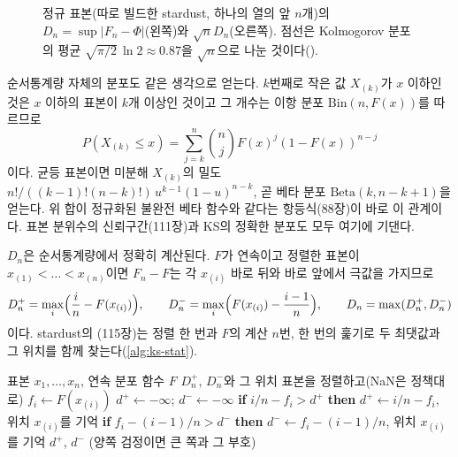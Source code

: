 \begin{figure}[htbp]
\centering
{}\hfill
{}
\caption{정규 표본(따로 빌드한 stardust, 하나의 열의 앞 $n$개)의 $D_n=\sup|F_n-\Phi|$(왼쪽)와 $\sqrt nD_n$(오른쪽). 점선은 Kolmogorov 분포의 평균 $\sqrt{\pi/2}\,\ln2\approx0.87$을 $\sqrt n$으로 나눈 것이다().}
\label{fig:gc}
\end{figure}

순서통계량 자체의 분포도 같은 생각으로 얻는다. $k$번째로 작은 값 $X_{(k)}$가 $x$ 이하인 것은 $x$ 이하의 표본이 $k$개 이상인 것이고 그 개수는 이항 분포 $\mathrm{Bin}(n,F(x))$를 따르므로
\[
P(X_{(k)}\le x)=\sum_{j=k}^n\binom njF(x)^j(1-F(x))^{n-j}
\]
이다. 균등 표본이면 미분해 $X_{(k)}$의 밀도 $n!/((k-1)!(n-k)!)\,u^{k-1}(1-u)^{n-k}$, 곧 베타 분포 $\mathrm{Beta}(k,n-k+1)$을 얻는다. 위 합이 정규화된 불완전 베타 함수와 같다는 항등식(88장)이 바로 이 관계이다. 표본 분위수의 신뢰구간(111장)과 KS의 정확한 분포도 모두 여기에 기댄다.

$D_n$은 순서통계량에서 정확히 계산된다. $F$가 연속이고 정렬한 표본이 $x_{(1)}<\dots<x_{(n)}$이면 $F_n-F$는 각 $x_{(i)}$ 바로 뒤와 바로 앞에서 극값을 가지므로
\[
D_n^+=\max_i\Bigl(\frac in-F(x_{(i)})\Bigr),\qquad D_n^-=\max_i\Bigl(F(x_{(i)})-\frac{i-1}n\Bigr),\qquad D_n=\max(D_n^+,D_n^-)
\]
이다. stardust의 (115장)는 정렬 한 번과 $F$의 계산 $n$번, 한 번의 훑기로 두 최댓값과 그 위치를 함께 찾는다(\cref{alg:ks-stat}).

\begin{algorithm}[htbp]
\begin{algorithmic}[1]
\Require 표본 $x_1,\dots,x_n$, 연속 분포 함수 $F$
\Ensure $D_n^+$, $D_n^-$와 그 위치
\State 표본을 정렬하고(NaN은 정책대로) $f_i\gets F(x_{(i)})$
\State $d^+\gets-\infty$; $d^-\gets-\infty$
  \State \textbf{if} $i/n-f_i>d^+$ \textbf{then} $d^+\gets i/n-f_i$, 위치 $x_{(i)}$를 기억
  \State \textbf{if} $f_i-(i-1)/n>d^-$ \textbf{then} $d^-\gets f_i-(i-1)/n$, 위치 $x_{(i)}$를 기억
\EndFor
\State \Return $d^+$, $d^-$ (양쪽 검정이면 큰 쪽과 그 부호)
\end{algorithmic}
\caption{한 표본 Kolmogorov--Smirnov 통계량 (stardust 의 )}
\label{alg:ks-stat}
\end{algorithm}


